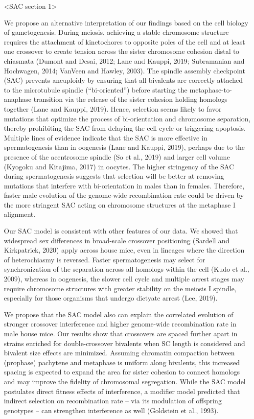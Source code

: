 \documentclass[
]{article}
\begin{document}
\textless SAC section 1\textgreater{}

We propose an alternative interpretation of our findings based on the
cell biology of gametogenesis. During meiosis, achieving a stable
chromosome structure requires the attachment of kinetochores to opposite
poles of the cell and at least one crossover to create tension across
the sister chromosome cohesion distal to chiasmata (Dumont and Desai,
2012; Lane and Kauppi, 2019; Subramanian and Hochwagen, 2014; VanVeen
and Hawley, 2003). The spindle assembly checkpoint (SAC) prevents
aneuploidy by ensuring that all bivalents are correctly attached to the
microtubule spindle (``bi-oriented'') before starting the
metaphase-to-anaphase transition via the release of the sister cohesion
holding homologs together (Lane and Kauppi, 2019). Hence, selection
seems likely to favor mutations that optimize the process of
bi-orientation and chromosome separation, thereby prohibiting the SAC
from delaying the cell cycle or triggering apoptosis. Multiple lines of
evidence indicate that the SAC is more effective in spermatogenesis than
in oogenesis (Lane and Kauppi, 2019), perhaps due to the presence of the
acentrosome spindle (So et al., 2019) and larger cell volume (Kyogoku
and Kitajima, 2017) in oocytes. The higher stringency of the SAC during
spermatogenesis suggests that selection will be better at removing
mutations that interfere with bi-orientation in males than in females.
Therefore, faster male evolution of the genome-wide recombination rate
could be driven by the more stringent SAC acting on chromosome
structures at the metaphase I alignment.

Our SAC model is consistent with other features of our data. We showed
that widespread sex differences in broad-scale crossover positioning
(Sardell and Kirkpatrick, 2020) apply across house mice, even in
lineages where the direction of heterochiasmy is reversed. Faster
spermatogenesis may select for synchronization of the separation across
all homologs within the cell (Kudo et al., 2009), whereas in oogenesis,
the slower cell cycle and multiple arrest stages may require chromosome
structures with greater stability on the meiosis I spindle, especially
for those organisms that undergo dictyate arrest (Lee, 2019).

We propose that the SAC model also can explain the correlated evolution
of stronger crossover interference and higher genome-wide recombination
rate in male house mice. Our results show that crossovers are spaced
further apart in strains enriched for double-crossover bivalents when SC
length is considered and bivalent size effects are minimized. Assuming
chromatin compaction between (prophase) pachytene and metaphase is
uniform along bivalents, this increased spacing is expected to expand
the area for sister cohesion to connect homologs and may improve the
fidelity of chromosomal segregation. While the SAC model postulates
direct fitness effects of interference, a modifier model predicted that
indirect selection on recombination rate -- via its modulation of
offspring genotypes -- can strengthen interference as well (Goldstein et
al., 1993).
\end{document}
